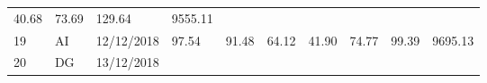 \documentclass[
  11pt,
]{article}
\begin{document}
\begin{longtable}[]{@{}llllllllll@{}}
\begin{minipage}[t]{0.06\columnwidth}
40.68\strut
\end{minipage} & \begin{minipage}[t]{0.06\columnwidth}\raggedright
73.69\strut
\end{minipage} & \begin{minipage}[t]{0.13\columnwidth}\raggedright
129.64\strut
\end{minipage} & \begin{minipage}[t]{0.08\columnwidth}\raggedright
9555.11\strut
\end{minipage}\tabularnewline
\begin{minipage}[t]{0.04\columnwidth}\raggedright
19\strut
\end{minipage} & \begin{minipage}[t]{0.09\columnwidth}\raggedright
AI\strut
\end{minipage} & \begin{minipage}[t]{0.10\columnwidth}\raggedright
12/12/2018\strut
\end{minipage} & \begin{minipage}[t]{0.06\columnwidth}\raggedright
97.54\strut
\end{minipage} & \begin{minipage}[t]{0.06\columnwidth}\raggedright
91.48\strut
\end{minipage} & \begin{minipage}[t]{0.06\columnwidth}\raggedright
64.12\strut
\end{minipage} & \begin{minipage}[t]{0.06\columnwidth}\raggedright
41.90\strut
\end{minipage} & \begin{minipage}[t]{0.06\columnwidth}\raggedright
74.77\strut
\end{minipage} & \begin{minipage}[t]{0.13\columnwidth}\raggedright
99.39\strut
\end{minipage} & \begin{minipage}[t]{0.08\columnwidth}\raggedright
9695.13\strut
\end{minipage}\tabularnewline
\begin{minipage}[t]{0.04\columnwidth}\raggedright
20\strut
\end{minipage} & \begin{minipage}[t]{0.09\columnwidth}\raggedright
DG\strut
\end{minipage} & \begin{minipage}[t]{0.10\columnwidth}\raggedright
13/12/2018\strut
\end{minipage} & \begin{minipage}[t]{0.06\columnwidth}\raggedright

\end{minipage}
\end{longtable}
\end{document}
